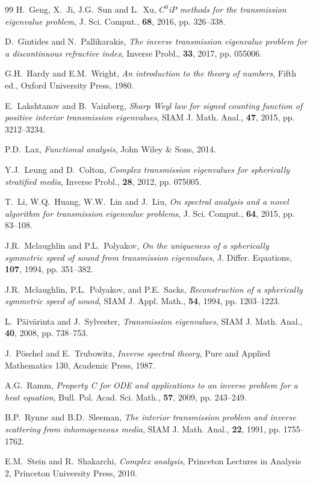 \documentclass[11pt,reqno]{amsart}
\theoremstyle{definition}
\theoremstyle{remark}
\numberwithin{equation}{section}
\begin{document}
\begin{thebibliography}{99}
	{H.~Geng, X.~Ji, J.G.~Sun and L.~Xu},
	{\it $C^{0}$iP methods for the transmission eigenvalue problem},
	J. Sci. Comput., \textbf{68}, 2016, pp. 326--338.
	
	{D.~Gintides and N.~Pallikarakis},
	{\it The inverse transmission eigenvalue problem for a discontinuous refractive index}, Inverse Probl., \textbf{33}, 2017, pp. 055006.
	
	{G.H.~Hardy and E.M.~Wright},
	{\it An introduction to the theory of numbers},
	Fifth ed., Oxford University Press, 1980.
	
	{E.~Lakshtanov and B.~Vainberg},
	{\it Sharp Weyl law for signed counting function of positive interior transmission eigenvalues},
	SIAM J. Math. Anal., \textbf{47}, 2015, pp. 3212--3234.
	
	{P.D.~Lax},
	{\it Functional analysis},
	John Wiley \& Sons, 2014.
	
	{Y.J.~Leung and D.~Colton},
	{\it Complex transmission eigenvalues for spherically stratified media},
	Inverse Probl., \textbf{28}, 2012, pp. 075005.
	
	{T.~Li, W.Q.~Huang, W.W.~Lin and J.~Liu},
	{\it On spectral analysis and a novel algorithm for transmission eigenvalue problems},
	J. Sci. Comput., \textbf{64}, 2015, pp. 83--108.
	
	{J.R.~Mclaughlin and P.L.~Polyakov},
	{\it On the uniqueness of a spherically symmetric speed of sound from transmission
	eigenvalues},
	J. Differ. Equations, \textbf{107}, 1994, pp. 351--382.	
	
	{J.R.~Mclaughlin, P.L.~Polyakov, and P.E.~Sacks},
	{\it Reconstruction of a spherically symmetric speed of sound},
	SIAM J. Appl. Math., \textbf{54}, 1994, pp. 1203--1223.
	
	{L.~P\"aiv\"arinta and J.~Sylvester},
	{\it Transmission eigenvalues},
	SIAM J. Math. Anal.,  \textbf{40}, 2008, pp. 738--753.
	
	{J.~P{\"o}schel and E.~Trubowitz},
	{\it Inverse spectral theory},
	Pure and Applied Mathematics 130, Academic Press, 1987.
	
	{A.G.~Ramm},
	{\it Property C for ODE and applications to an inverse problem for a heat equation},
	Bull. Pol. Acad. Sci. Math., \textbf{57}, 2009, pp. 243--249.
	
	{B.P.~Rynne and B.D.~Sleeman},
	{\it The interior transmission problem and inverse scattering from inhomogeneous media}, SIAM J. Math. Anal., \textbf{22}, 1991, pp. 1755--1762.
	
	{E.M.~Stein and R.~Shakarchi},
	{\it Complex analysis},
	Princeton Lectures in Analysis 2, Princeton University Press, 2010.
		
		
\end{thebibliography}
\end{document}
